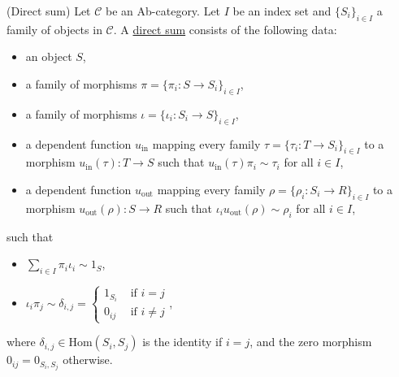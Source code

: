 \begin{definition}{(Direct sum)}\label{def:direct_sum}
Let $\mathcal{C}$ be an Ab-category. Let $I$ be an index set and $\{S_{i}\}_{i\in I}$ a family of objects in $\mathcal{C}$.
A \ul{direct sum} consists of the following data:
\begin{itemize}
\item an object $S$,
\item a family of morphisms $\pi = \{ \pi_{i} : S \rightarrow S_{i} \}_{i\in I}$,
\item a family of morphisms $\iota = \{ \iota_{i} : S_{i} \rightarrow S \}_{i\in I}$,
\item a dependent function $u_{\text{in}}$ mapping every family $\tau = \{ \tau_{i} : T \rightarrow S_{i} \}_{i\in I}$ to a morphism
$u_{\text{in}}(\tau) : T \rightarrow S$ such that $u_{\text{in}}(\tau) \pi_{i} \sim \tau_{i}$ for all $i \in I$,
\item a dependent function $u_{\text{out}}$ mapping every family $\rho = \{ \rho_{i} : S_{i} \rightarrow R \}_{i\in I}$ to a morphism
$u_{\text{out}}(\rho) : S \rightarrow R$ such that $\iota_{i} u_{\text{out}}(\rho) \sim \rho_{i}$ for all $i \in I$,
\end{itemize}
such that
\begin{itemize}
\item $\sum_{i\in I}  \pi_{i} \iota_{i} \sim 1_{S}$,
\item $ \iota_{i} \pi_{j} \sim \delta_{i, j} =  \begin{cases}
            1_{S_{i}} & \text{ if } i = j  \\
            0_{ij} & \text{ if } i \neq j
        \end{cases}$,
\end{itemize}
where $\delta_{i, j} \in \mathrm{Hom}(S_{i}, S_{j})$ is the identity if $i = j$, and the zero morphism $0_{ij} = 0_{S_{i}, S_{j}}$ otherwise.
\end{definition}

